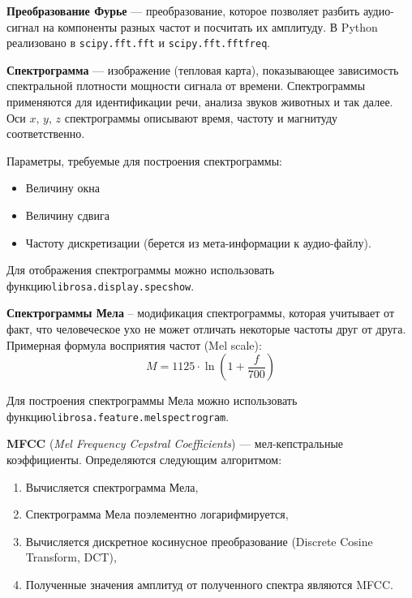 \begin{definition}
    \textbf{Преобразование Фурье}  --- преобразование, которое позволяет разбить аудио-сигнал на компоненты разных частот и посчитать их амплитуду. В Python реализовано в \texttt{scipy.fft.fft} и \texttt{scipy.fft.fftfreq}.
\end{definition}

\begin{definition}
    \textbf{Спектрограмма} --- изображение (тепловая карта), показывающее зависимость спектральной плотности мощности сигнала от времени. Спектрограммы применяются для идентификации речи, анализа звуков животных и так далее. Оси $x$, $y$, $z$ спектрограммы описывают время, частоту и магнитуду соответственно.
\end{definition}

Параметры, требуемые для построения спектрограммы:
\begin{itemize}
    \item Величину окна
    \item Величину сдвига
    \item Частоту дискретизации (берется из мета-информации к аудио-файлу).
\end{itemize}

\begin{remark}
    Для отображения спектрограммы можно использовать функцию\newline\texttt{librosa.display.specshow}.
\end{remark}

\begin{definition}
    \textbf{Спектрограммы Мела} -- модификация спектрограммы, которая учитывает от факт, что человеческое ухо не может отличать некоторые частоты друг от друга. Примерная формула восприятия частот (Mel scale):
    \[
        M=1125\cdot\ln\left(1+\dfrac{f}{700}\right)
    \]
\end{definition}

\begin{remark}
    Для построения спектрограммы Мела можно использовать функцию\newline\texttt{librosa.feature.melspectrogram}.
\end{remark}

\begin{definition}
    \textbf{MFCC} (\textit{Mel Frequency Cepstral Coefficients}) --- мел-кепстральные коэффициенты. Определяются следующим алгоритмом:
    \begin{enumerate}
        \item Вычисляется спектрограмма Мела,
        \item Спектрограмма Мела поэлементно логарифмируется,
        \item Вычисляется дискретное косинусное преобразование (Discrete Cosine Transform, DCT),
        \item Полученные значения амплитуд от полученного спектра являются MFCC.
    \end{enumerate}
\end{definition}

